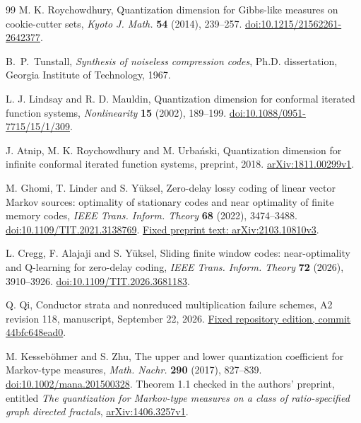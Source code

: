 \begin{thebibliography}{99}
M. K. Roychowdhury, Quantization dimension for Gibbs-like measures
on cookie-cutter sets, \emph{Kyoto J. Math.} \textbf{54} (2014),
239--257.
\href{https://doi.org/10.1215/21562261-2642377}{doi:10.1215/21562261-2642377}.

B.~P.~Tunstall, \emph{Synthesis of noiseless compression codes},
Ph.D. dissertation, Georgia Institute of Technology, 1967.

L. J. Lindsay and R. D. Mauldin, Quantization dimension for conformal
iterated function systems, \emph{Nonlinearity} \textbf{15} (2002), 189--199.
\href{https://doi.org/10.1088/0951-7715/15/1/309}{doi:10.1088/0951-7715/15/1/309}.

J. Atnip, M. K. Roychowdhury and M. Urba\'nski,
Quantization dimension for infinite conformal iterated function systems,
preprint, 2018. \href{https://arxiv.org/abs/1811.00299v1}{arXiv:1811.00299v1}.

M. Ghomi, T. Linder and S. Y\"uksel,
Zero-delay lossy coding of linear vector Markov sources: optimality of
stationary codes and near optimality of finite memory codes,
\emph{IEEE Trans. Inform. Theory} \textbf{68} (2022), 3474--3488.
\href{https://doi.org/10.1109/TIT.2021.3138769}{doi:10.1109/TIT.2021.3138769}.
\href{https://arxiv.org/abs/2103.10810v3}{Fixed preprint text: arXiv:2103.10810v3}.

L. Cregg, F. Alajaji and S. Y\"uksel,
Sliding finite window codes: near-optimality and Q-learning for zero-delay
coding, \emph{IEEE Trans. Inform. Theory} \textbf{72} (2026), 3910--3926.
\href{https://doi.org/10.1109/TIT.2026.3681183}{doi:10.1109/TIT.2026.3681183}.

Q. Qi, Conductor strata and nonreduced multiplication failure schemes,
A2 revision 118, manuscript, September 22, 2026.
\href{https://github.com/TrillionniumFoundation/theta-theory/tree/44bfc648ead008896a6981a7302a6d5ab8b21bb8/papers/A2-v17-boundary-information-coarsening/article/v118}{Fixed repository edition, commit 44bfc648ead0}.

M. Kesseb\"ohmer and S. Zhu, The upper and lower quantization coefficient
for Markov-type measures, \emph{Math. Nachr.} \textbf{290} (2017), 827--839.
\href{https://doi.org/10.1002/mana.201500328}{doi:10.1002/mana.201500328}.
Theorem 1.1 checked in the authors' preprint, entitled
\emph{The quantization for Markov-type measures on a class of
ratio-specified graph directed fractals},
\href{https://arxiv.org/abs/1406.3257v1}{arXiv:1406.3257v1}.


\end{thebibliography}
